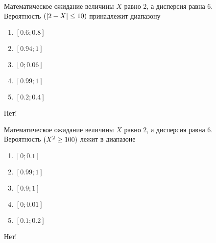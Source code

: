 \documentclass[t]{beamer}
\let\P\relax
\DeclareMathOperator{\P}{\mathbb{P}}
\begin{document}
 \begin{frame} \label{33-No} 
\begin{block}{33} 

Математическое ожидание величины $X$ равно 2, а дисперсия равна 6. Вероятность $\P(|2-X|\leq 10)$ принадлежит диапазону
  


 \end{block} 
\begin{enumerate} 
\item[] \hyperlink{33-No}{\beamergotobutton{} $[0.6; 0.8]$}
\item[] \hyperlink{33-Yes}{\beamergotobutton{} $[0.94; 1]$}
\item[] \hyperlink{33-No}{\beamergotobutton{} $[0; 0.06]$}
\item[] \hyperlink{33-No}{\beamergotobutton{} $[0.99;1]$}
\item[] \hyperlink{33-No}{\beamergotobutton{} $[0.2;0.4]$}
\end{enumerate} 

 \alert{Нет!} 
\end{frame} 


 \begin{frame} \label{34-No} 
\begin{block}{34} 

Математическое ожидание величины $X$ равно 2, а дисперсия равна 6. Вероятность $\P(X^2 \geq 100)$ лежит в диапазоне
  


 \end{block} 
\begin{enumerate} 
\item[] \hyperlink{34-Yes}{\beamergotobutton{} $[0;0.1]$}
\item[] \hyperlink{34-No}{\beamergotobutton{} $[0.99;1]$}
\item[] \hyperlink{34-No}{\beamergotobutton{} $[0.9;1]$}
\item[] \hyperlink{34-No}{\beamergotobutton{} $[0;0.01]$}
\item[] \hyperlink{34-No}{\beamergotobutton{} $[0.1;0.2]$}
\end{enumerate} 

 \alert{Нет!} 
\end{frame} 
\end{document}
